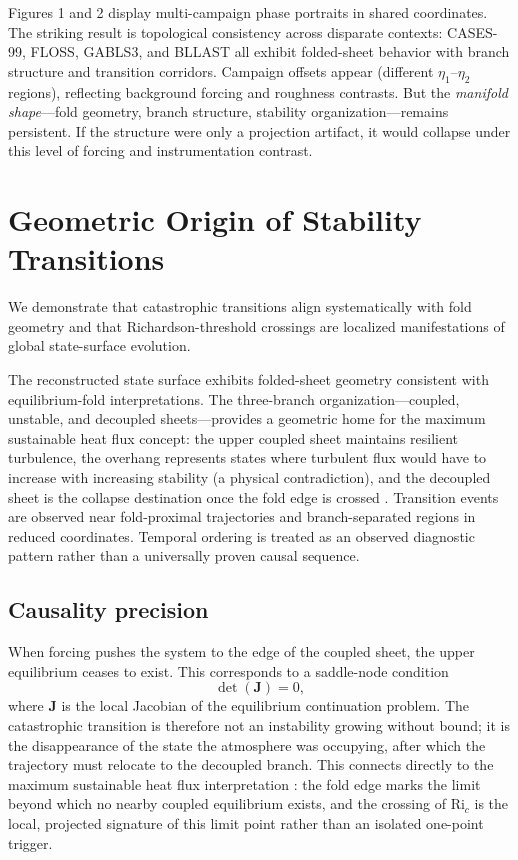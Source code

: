 \documentclass[12pt,a4paper]{article}
\newcommand{\Ric}{\mathrm{Ri}_c}
\newcommand{\mat}[1]{\mathbf{#1}}
\begin{document}
Figures 1 and 2 display multi-campaign phase portraits in shared coordinates. The striking result is topological consistency across disparate contexts: CASES-99, FLOSS, GABLS3, and BLLAST all exhibit folded-sheet behavior with branch structure and transition corridors. Campaign offsets appear (different $\eta_1$--$\eta_2$ regions), reflecting background forcing and roughness contrasts. But the \emph{manifold shape}---fold geometry, branch structure, stability organization---remains persistent. If the structure were only a projection artifact, it would collapse under this level of forcing and instrumentation contrast.

\section{Geometric Origin of Stability Transitions}

We demonstrate that catastrophic transitions align systematically with fold geometry and that Richardson-threshold crossings are localized manifestations of global state-surface evolution.

The reconstructed state surface exhibits folded-sheet geometry consistent with equilibrium-fold interpretations. The three-branch organization---coupled, unstable, and decoupled sheets---provides a geometric home for the maximum sustainable heat flux concept: the upper coupled sheet maintains resilient turbulence, the overhang represents states where turbulent flux would have to increase with increasing stability (a physical contradiction), and the decoupled sheet is the collapse destination once the fold edge is crossed \citep{vandewiel2017, mcnider1995}. Transition events are observed near fold-proximal trajectories and branch-separated regions in reduced coordinates. Temporal ordering is treated as an observed diagnostic pattern rather than a universally proven causal sequence.

\subsection{Causality precision}

When forcing pushes the system to the edge of the coupled sheet, the upper equilibrium ceases to exist. This corresponds to a saddle-node condition
\begin{equation}
\det(\mat{J}) = 0,
\end{equation}
where $\mat{J}$ is the local Jacobian of the equilibrium continuation problem. The catastrophic transition is therefore not an instability growing without bound; it is the disappearance of the state the atmosphere was occupying, after which the trajectory must relocate to the decoupled branch. This connects directly to the maximum sustainable heat flux interpretation \citep{vandewiel2017}: the fold edge marks the limit beyond which no nearby coupled equilibrium exists, and the crossing of $\Ric$ is the local, projected signature of this limit point rather than an isolated one-point trigger.
\end{document}
